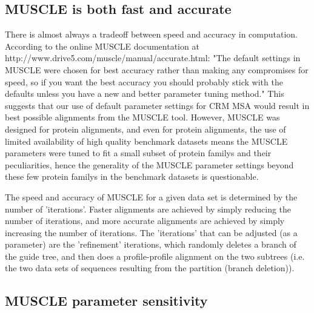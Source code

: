\subsection{MUSCLE is both fast and accurate }

There is almost always a tradeoff between speed and accuracy in computation.  According to the online MUSCLE documentation at http://www.drive5.com/muscle/manual/accurate.html: "The default settings in MUSCLE were chosen for best accuracy rather than making any compromises for speed, so if you want the best accuracy you should probably stick with the defaults unless you have a new and better parameter tuning method."  This suggests that our use of default parameter settings for CRM MSA would result in best possible alignments from the MUSCLE tool.  However, MUSCLE was designed for protein alignments, and even for protein alignments, the use of limited availability of high quality benchmark datasets means the MUSCLE parameters were tuned to fit a small subset of protein familys and their peculiarities, hence the generality of the MUSCLE parameter settings beyond these few protein familys in the benchmark datasets is questionable.

The speed and accuracy of MUSCLE for a given data set is determined by the number of 'iterations'.  Faster alignments are achieved by simply reducing the number of iterations, and more accurate alignments are achieved by simply increasing the number of iterations.  The 'iterations' that can be adjusted (as a parameter) are the 'refinement' iterations, which randomly deletes a branch of the guide tree, and then does a profile-profile alignment on the two subtrees (i.e. the two data sets of sequences resulting from the partition (branch deletion)).    
\subsection{MUSCLE parameter sensitivity }



